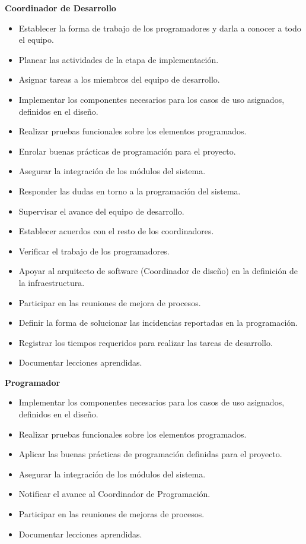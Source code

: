 \textbf{Coordinador de Desarrollo}
\begin{itemize}
 \item Establecer la forma de trabajo de los programadores y darla a conocer a todo el equipo.
 \item Planear las actividades de la etapa de implementación.
 \item Asignar tareas a los miembros del equipo de desarrollo.
 \item Implementar los componentes necesarios para los casos de uso asignados, definidos en el diseño.
 \item Realizar pruebas funcionales sobre los elementos programados.
 \item Enrolar buenas prácticas de programación para el proyecto.
 \item Asegurar la integración de los módulos del sistema.
 \item Responder las dudas en torno a la programación del sistema.
 \item Supervisar el avance del equipo de desarrollo.
 \item Establecer acuerdos con el resto de los coordinadores.
 \item Verificar el trabajo de los programadores.
 \item Apoyar al arquitecto de software (Coordinador de diseño) en la definición de la infraestructura.
 \item Participar en las reuniones de mejora de procesos.
 \item Definir la forma de solucionar las incidencias reportadas en la programación.
 \item Registrar los tiempos requeridos para realizar las tareas de desarrollo.
 \item Documentar lecciones aprendidas.\\
\end{itemize}
\newpage 
\textbf{Programador}
\begin{itemize}
 \item Implementar los componentes necesarios para los casos de uso asignados, definidos en el diseño.
 \item Realizar pruebas funcionales sobre los elementos programados.
 \item Aplicar las buenas prácticas de programación definidas para el proyecto.
 \item Asegurar la integración de los módulos del sistema.
 \item Notificar el avance al Coordinador de Programación.
 \item Participar en las reuniones de mejoras de procesos.
 \item Documentar lecciones aprendidas.\\
\end{itemize}

